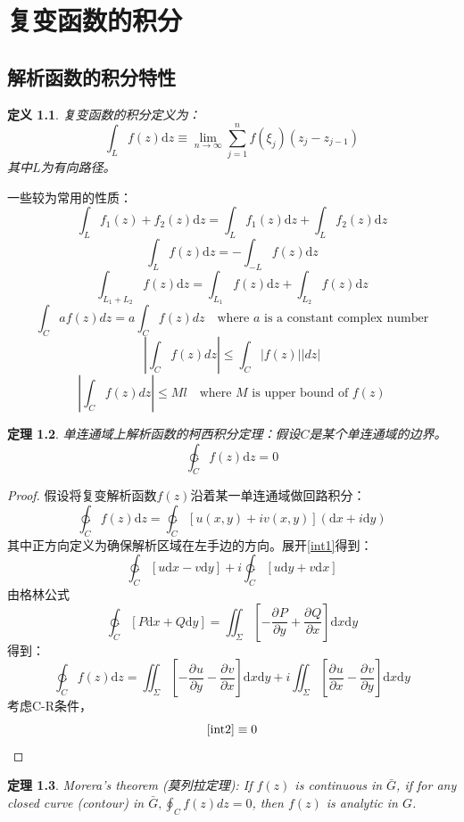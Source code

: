 \documentclass[10pt, a4paper, oneside]{ctexbook}
\newtheorem{theorem}{定理}[section]
\newtheorem{definition}[theorem]{定义}
\def\D{\mathrm{d}}
\def\Fex{\ensuremath{u(x,y)+iv(x,y)}}
\newcommand{\partdev}[3][]
{\ensuremath{\frac{\displaystyle \partial^{#1} #2}{ \displaystyle \partial #3}}}
\newcommand{\F}[1][z]
{\ensuremath{f(#1)}}
\begin{document}
\chapter{ 复变函数的积分}

\section{解析函数的积分特性}

\begin{definition}
    复变函数的积分定义为：
    $$\int_L f(z) \D z \equiv \lim_{n\to\infty}\sum_{j=1}^n f(\xi_j)(z_j-z_{j-1})$$
    其中$L$为有向路径。
\end{definition}
一些较为常用的性质：
$$\int_L f_1(z)+f_2(z)\D z=\int_L f_1(z)\D z+\int_L f_2(z)\D z$$
$$\int_L f(z)\D z = -\int_{-L} f(z)\D z$$
$$\int_{L_1+L_2} f(z)\D z = \int_{L_1} f(z)\D z+\int_{L_2} f(z)\D z$$
$$\int_{C} a f(z) d z=a \int_{C} f(z) d z \quad \text{where $a$ is a constant complex number}$$ 
\begin{equation*}
\left|\int_{C} f(z) d z\right| \leq \int_{C}|f(z)||d z|
\end{equation*}
$$\left|\int_{C} f(z) d z\right| \leq M l \quad \text{where $M$ is upper bound of $f(z)$}$$
\begin{theorem}
    单连通域上解析函数的柯西积分定理：假设$C$是某个单连通域的边界。
    $$\ointctrclockwise_C \F \D z = 0$$
\end{theorem}
\begin{proof}
    假设将复变解析函数$\F$沿着某一单连通域做回路积分：
\begin{equation}
    \label{int1}
    \ointctrclockwise_C \F \D z = \ointctrclockwise_C \left[\Fex\right](\D x + i \D y)
\end{equation}
其中正方向定义为确保解析区域在左手边的方向。展开\ref{int1}得到：
$$\ointctrclockwise_C \left[u\D x- v\D y\right] + i \ointctrclockwise_C \left[u\D y+ v\D x\right]$$
由格林公式
$$\ointctrclockwise_C \left[P\D x+ Q\D y\right] = \iint_\Sigma \left[-\partdev{P}{y}+\partdev{Q}{x}\right]\D x\D y$$
得到：
\begin{equation}
    \label{int2}
    \ointctrclockwise_C \F \D z=  \iint_\Sigma \left[-\partdev{u}{y}-\partdev{v}{x}\right]\D x\D y+i\iint_{\Sigma} \left[\partdev{u}{x}-\partdev{v}{y}\right]\D x\D y
\end{equation}
考虑{\rm C-R}条件，
$$\ref{int2}\equiv 0$$
\end{proof}
\begin{theorem}
    Morera's theorem ({莫列拉定理}): If $f(z)$ is continuous in $\bar{G}$, if for any closed curve (contour) in $\displaystyle \bar{G}, \oint_{C} f(z) d z=0$, then $f(z)$ is analytic in $G$.
\end{theorem}
\end{document}
